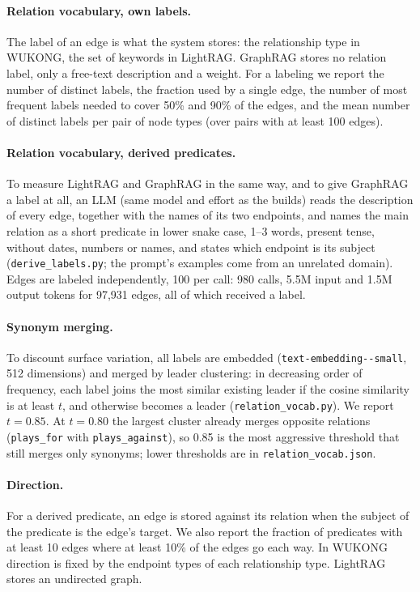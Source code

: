 \documentclass[11pt]{article}
\newcommand{\code}[1]{\texttt{#1}}
\newcommand{\wk}{WUKONG}
\begin{document}
\paragraph{Relation vocabulary, own labels.} The label of an edge is what the system stores:
the relationship type in \wk, the set of keywords in LightRAG. GraphRAG stores no relation
label, only a free-text description and a weight. For a labeling we report the number of
distinct labels, the fraction used by a single edge, the number of most frequent labels needed
to cover 50\% and 90\% of the edges, and the mean number of distinct labels per pair of node
types (over pairs with at least 100 edges).

\paragraph{Relation vocabulary, derived predicates.} To measure LightRAG and GraphRAG in the same
way, and to give GraphRAG a label at all, an LLM (same model and effort as the builds) reads the
description of every edge, together with the names of its two endpoints, and names the main
relation as a short predicate in lower snake case, 1--3 words, present tense, without dates,
numbers or names, and states which endpoint is its subject (\code{derive\_labels.py}; the prompt's
examples come from an unrelated domain). Edges are labeled independently, 100 per call: 980 calls,
5.5M input and 1.5M output tokens for 97,931 edges, all of which received a label.

\paragraph{Synonym merging.} To discount surface variation, all labels are embedded
(\code{text-\allowbreak embedding--small}, 512 dimensions) and merged by leader clustering: in decreasing
order of frequency, each label joins the most similar existing leader if the cosine similarity
is at least $t$, and otherwise becomes a leader (\code{relation\_vocab.py}). We report
$t = 0.85$. At $t = 0.80$ the largest cluster already merges opposite relations
(\code{plays\_for} with \code{plays\_against}), so 0.85 is the most aggressive threshold that still
merges only synonyms; lower thresholds are in \code{relation\_vocab.json}.

\paragraph{Direction.} For a derived predicate, an edge is stored against its relation when the
subject of the predicate is the edge's target. We also report the fraction of predicates with at
least 10 edges where at least 10\% of the edges go each way. In \wk{} direction is fixed by the
endpoint types of each relationship type. LightRAG stores an undirected graph.
\end{document}
